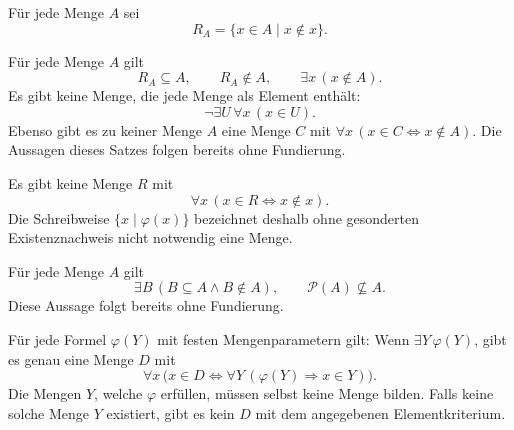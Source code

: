 \begin{definition}
Für jede Menge $A$ sei
\[
 R_A=\{x\in A\mid x\notin x\}.
\]
\end{definition}

\begin{theorem}
\label{b03guide:thm:russell}
Für jede Menge $A$ gilt
\[
 R_A\subseteq A,\qquad R_A\notin A,\qquad
 \exists x\,(x\notin A).
\]
Es gibt keine Menge, die jede Menge als Element enthält:
\[
 \neg\exists U\,\forall x\,(x\in U).
\]
Ebenso gibt es zu keiner Menge $A$ eine Menge $C$ mit
$\forall x\,(x\in C\Longleftrightarrow x\notin A)$.
Die Aussagen dieses Satzes folgen bereits ohne Fundierung.
\cite{pila}
\end{theorem}

\begin{theorem}
Es gibt keine Menge $R$ mit
\[
 \forall x\,(x\in R\Longleftrightarrow x\notin x).
\]
Die Schreibweise $\{x\mid\varphi(x)\}$ bezeichnet deshalb ohne
gesonderten Existenznachweis nicht notwendig eine Menge.
\end{theorem}

\begin{theorem}
\label{b03guide:thm:missingsubset}
Für jede Menge $A$ gilt
\[
 \exists B\,(B\subseteq A\land B\notin A),\qquad
 \mathcal P(A)\nsubseteq A.
\]
Diese Aussage folgt bereits ohne Fundierung.
\end{theorem}

\begin{theorem}
\label{b03guide:thm:definableintersection}
Für jede Formel $\varphi(Y)$ mit festen Mengenparametern gilt:
Wenn $\exists Y\,\varphi(Y)$, gibt es genau eine Menge $D$ mit
\[
 \forall x\,\bigl(
 x\in D\Longleftrightarrow
             \forall Y\,(\varphi(Y)\Rightarrow x\in Y)\bigr).
\]
Die Mengen $Y$, welche $\varphi$ erfüllen, müssen selbst keine
Menge bilden. Falls keine solche Menge $Y$ existiert, gibt es
kein $D$ mit dem angegebenen Elementkriterium.
\cite{kearnes}
\end{theorem}
